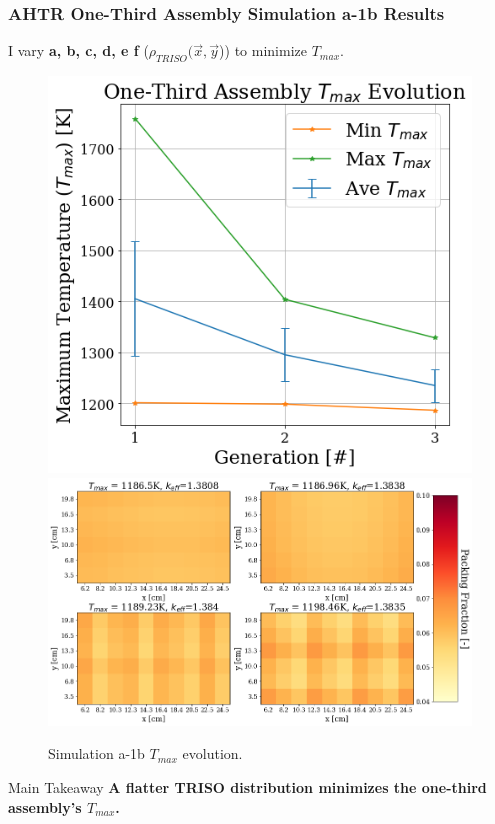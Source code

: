 \begin{frame}
    \frametitle{AHTR One-Third Assembly Simulation a-1b Results}
    I vary \textbf{a, b, c, d, e f} ($\rho_{TRISO}(\vec{x}, \vec{y}$))
    to minimize $T_{max}$. 
    \begin{figure}
        \includegraphics[width=0.39\linewidth]{figures/assem-obj-1-temp-evol-pres.png} 
        \includegraphics[width=0.59\linewidth]{../docs/figures/assem-obj-1-temp-final.png}
        \caption{Simulation a-1b $T_{max}$ evolution.}
    \end{figure}
    \begin{alertblock}{Main Takeaway}
    \textbf{A flatter TRISO distribution minimizes the one-third assembly's 
    $T_{max}$.}
    \end{alertblock}
\end{frame}

